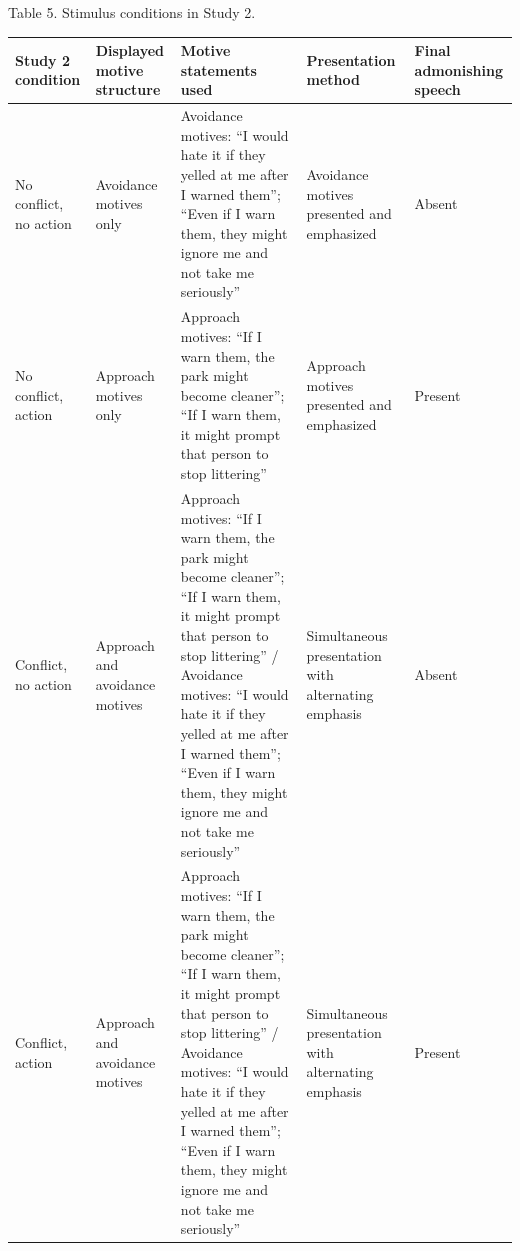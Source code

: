 \documentclass[
]{article}
\newcounter{none} %
\begin{document}
Table 5. Stimulus conditions in Study 2.

{\def\LTcaptype{none} %
\begin{longtable}[]{@{}
  >{\raggedright\arraybackslash}p{}
  >{\raggedright\arraybackslash}p{}
  >{\raggedright\arraybackslash}p{}
  >{\raggedright\arraybackslash}p{}
  >{\raggedright\arraybackslash}p{}@{}}
\toprule\noalign{}
\begin{minipage}[b]{\linewidth}\raggedright
Study 2 condition
\end{minipage} & \begin{minipage}[b]{\linewidth}\raggedright
Displayed motive structure
\end{minipage} & \begin{minipage}[b]{\linewidth}\raggedright
Motive statements used
\end{minipage} & \begin{minipage}[b]{\linewidth}\raggedright
Presentation method
\end{minipage} & \begin{minipage}[b]{\linewidth}\raggedright
Final admonishing speech
\end{minipage} \\
\midrule\noalign{}
\endhead
\bottomrule\noalign{}
\endlastfoot
No conflict, no action & Avoidance motives only & Avoidance motives: ``I
would hate it if they yelled at me after I warned them''; ``Even if I
warn them, they might ignore me and not take me seriously'' & Avoidance
motives presented and emphasized & Absent \\
No conflict, action & Approach motives only & Approach motives: ``If I
warn them, the park might become cleaner''; ``If I warn them, it might
prompt that person to stop littering'' & Approach motives presented and
emphasized & Present \\
Conflict, no action & Approach and avoidance motives & Approach motives:
``If I warn them, the park might become cleaner''; ``If I warn them, it
might prompt that person to stop littering'' / Avoidance motives: ``I
would hate it if they yelled at me after I warned them''; ``Even if I
warn them, they might ignore me and not take me seriously'' &
Simultaneous presentation with alternating emphasis & Absent \\
Conflict, action & Approach and avoidance motives & Approach motives:
``If I warn them, the park might become cleaner''; ``If I warn them, it
might prompt that person to stop littering'' / Avoidance motives: ``I
would hate it if they yelled at me after I warned them''; ``Even if I
warn them, they might ignore me and not take me seriously'' &
Simultaneous presentation with alternating emphasis & Present \\
\end{longtable}
}
\end{document}
